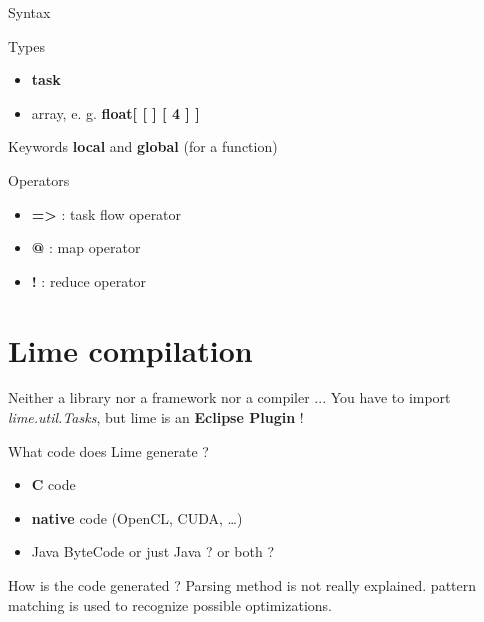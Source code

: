 \documentclass[10pt, compress]{beamer}
\begin{document}
\begin{frame}{Syntax}
    \begin{block}{Types}
        \begin{itemize}
        \item \textbf{task}
        \item array, e. g. \textbf{float[ [ ] [ 4 ] ]}
        \end{itemize}
    \end{block}
    \begin{block}{Keywords}
    \hspace{4ex} \textbf{local} and \textbf{global} (for a function)
    \end{block}
    \begin{block}{Operators}
        \begin{itemize}
        \item \textbf{=>} : task flow operator
        \item \textbf{@} : map operator
        \item \textbf{!} : reduce operator
        \end{itemize}
    \end{block}
\end{frame}


\section{Lime compilation}

\begin{frame}{Neither a library nor a framework nor a compiler ...}
    You have to import \emph{lime.util.Tasks}, but lime is an \textbf{Eclipse Plugin} !
    \begin{block}{What code does Lime generate ?}
        \begin{itemize}
        \item \textbf{C} code
        \item \textbf{native} code (OpenCL, CUDA, \ldots)
        \item Java ByteCode or just Java ? or both ?
        \end{itemize}
    \end{block}
    \begin{block}{How is the code generated ?}
        Parsing method is not really explained.
        \alert{pattern matching} is used to recognize possible optimizations.
    \end{block}
\end{frame}
\end{document}
